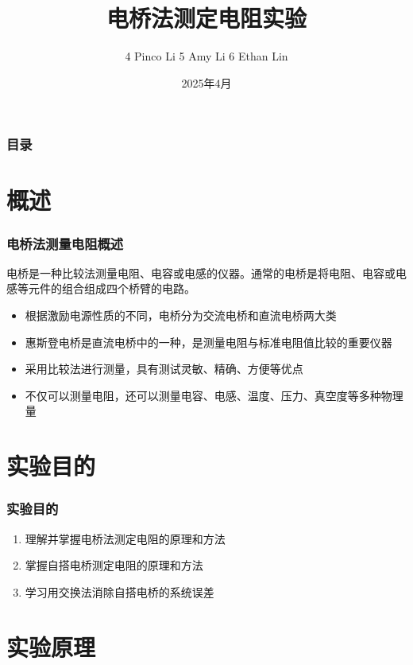 \documentclass{beamer}
\title[电桥法测定电阻] %
{电桥法测定电阻实验}
\author[4 Pinco Li 5 Amy Li 6 Ethan Lin] %
{4 Pinco Li 5 Amy Li 6 Ethan Lin}
\institute[SCUT] %
{
	华南理工大学 \\
	大学物理实验
}
\date[2025年4月]%
{2025年4月}
\begin{document}

	\frame{\titlepage}
	
	\begin{frame}
		\frametitle{目录}
		\tableofcontents
	\end{frame}

	\section{概述}
	
	\begin{frame}
		\frametitle{电桥法测量电阻概述}
		
		电桥是一种比较法测量电阻、电容或电感的仪器。通常的电桥是将电阻、电容或电感等元件的组合组成四个桥臂的电路。
		
		\begin{itemize}
			\item 根据激励电源性质的不同，电桥分为交流电桥和直流电桥两大类
			\item 惠斯登电桥是直流电桥中的一种，是测量电阻与标准电阻值比较的重要仪器
			\item 采用比较法进行测量，具有测试灵敏、精确、方便等优点
			\item 不仅可以测量电阻，还可以测量电容、电感、温度、压力、真空度等多种物理量
		\end{itemize}
		
	\end{frame}

	\section{实验目的}
	
	\begin{frame}
		\frametitle{实验目的}
		
		\begin{enumerate}
			\item 理解并掌握电桥法测定电阻的原理和方法
			\item 掌握自搭电桥测定电阻的原理和方法
			\item 学习用交换法消除自搭电桥的系统误差
		\end{enumerate}
		
	\end{frame}

	\section{实验原理}
	
\end{document}
